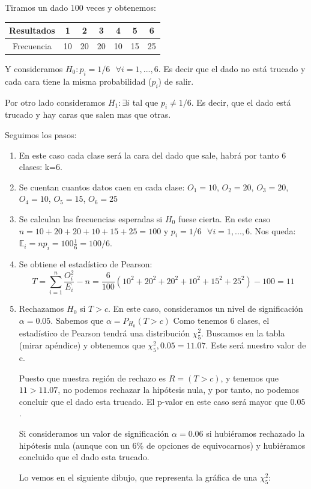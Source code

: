 \documentclass[palatino,nochap]{apuntes}
\begin{document}
\begin{example}
Tiramos un dado 100 veces y obtenemos:

\begin{tabular}{|c|c|c|c|c|c|c|}
\hline
Resultados & 1 & 2 & 3 & 4 & 5 & 6 \\
\hline
Frecuencia & 10 & 20 & 20 & 10 & 15 & 25\\
\hline
\end{tabular}

Y consideramos $H_0: p_i=1/6 \text{ } \forall i=1,...,6$. Es decir que el dado no está trucado y cada cara tiene la misma probabilidad ($p_i$) de salir.

Por otro lado consideramos $H_1: \exists i$ tal que $p_i\neq 1/6$. Es decir, que el dado está trucado y hay caras que salen mas que otras.

Seguimos los pasos:
\begin{enumerate}
\item En este caso cada clase será la cara del dado que sale, habrá por tanto 6 clases: k=6.
\item Se cuentan cuantos datos caen en cada clase: $O_1=10$, $O_2=20$, $O_3=20$, $O_4=10$, $O_5=15$, $O_6=25$
\item Se calculan las frecuencias esperadas si $H_0$ fuese cierta. En este caso $n=10+20+20+10+15+25=100$ y $p_i=1/6 \text{ } \forall i=1,...,6$. Nos queda: $\mathbb{E}_i=np_i = 100 \frac{1}{6}=100/6$.
\item Se obtiene el estadístico de Pearson:
\[
T=\sum_{i=1}^n \frac{O_i^2}{E_i}-n = \frac{6}{100}(10^2+20^2+20^2+10^2+15^2+25^2)-100=11
\]
\item Rechazamos $H_0$ si $T>c$. En este caso, consideramos un nivel de significación $\alpha = 0.05$. Sabemos que $\alpha = P_{H_0}(T>c)$ Como tenemos 6 clases, el estadístico de Pearson tendrá una distribución $\chi^2_5$. Buscamos en la tabla (mirar apéndice) y obtenemos que $\chi^2_5, 0.05 = 11.07$. Este será nuestro valor de c.

Puesto que nuestra región de rechazo es $R=(T>c)$, y tenemos que $11>11.07$, no podemos rechazar la hipótesis nula, y por tanto, no podemos concluir que el dado esta trucado. El p-valor en este caso será mayor que $0.05$.

Si consideramos un valor de significación $\alpha = 0.06$ si hubiéramos rechazado la hipótesis nula (aunque con un 6\% de opciones de equivocarnos) y hubiéramos concluido que el dado esta trucado. 

Lo vemos en el siguiente dibujo, que representa la gráfica de una $\chi^2_5$:


\end{enumerate}
\end{example}
\end{document}
